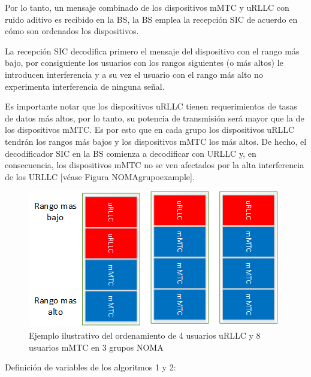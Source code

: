 Por lo tanto, un mensaje combinado de los dispositivos mMTC y uRLLC con ruido aditivo es recibido en la BS, la BS emplea la recepción SIC de acuerdo en cómo son ordenados los dispositivos. \newline

La recepción SIC decodifica primero el mensaje del dispositivo con el rango más bajo, por consiguiente los usuarios con los rangos siguientes (o más altos) le introducen interferencia y a su vez el usuario con el rango más alto no experimenta interferencia de ninguna señal.\newline

Es importante notar que los dispositivos uRLLC tienen requerimientos de tasas de datos más altos, por lo tanto, su potencia de transmisión será mayor que la de los dispositivos mMTC. Es por esto que en cada grupo los dispositivos uRLLC tendrán los rangos más bajos y los dispositivos mMTC los más altos. De hecho, el decodificador SIC en la BS comienza a decodificar con URLLC y, en consecuencia, los dispositivos mMTC no se ven afectados por la alta interferencia de los URLLC [véase Figura NOMAgrupoexample].\newline




\begin{figure}[th]
    \centering
    \includegraphics[scale=1]{Figures/EjemploNOMAclusters}
    \decoRule
    \caption[Ejemplo ilustrativo del ordenamiento de usuarios en los grupos NOMA]{Ejemplo ilustrativo del ordenamiento de 4 usuarios uRLLC y 8 usuarios mMTC en 3 grupos NOMA}
    \label{fig:NOMAgrupoexample}
\end{figure}





Definición de variables de los algoritmos 1 y 2:\newline

